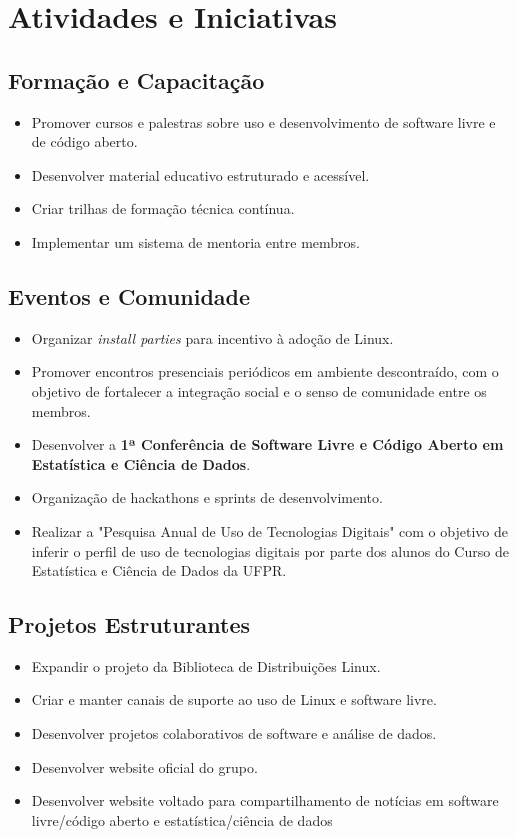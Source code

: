 \documentclass[11pt,a4paper]{article}
\begin{document}
\section{Atividades e Iniciativas}

\subsection{Formação e Capacitação}

\begin{itemize}
    \item Promover cursos e palestras sobre uso e desenvolvimento de software livre e de código aberto.
    \item Desenvolver material educativo estruturado e acessível.
    \item Criar trilhas de formação técnica contínua.
    \item Implementar um sistema de mentoria entre membros.
\end{itemize}

\subsection{Eventos e Comunidade}

\begin{itemize}
    \item Organizar \textit{install parties} para incentivo à adoção de Linux.
    \item Promover encontros presenciais periódicos em ambiente descontraído, com o objetivo de fortalecer a integração social e o senso de comunidade entre os membros.
    \item Desenvolver a \textbf{1ª Conferência de Software Livre e Código Aberto em Estatística e Ciência de Dados}.
    \item Organização de hackathons e sprints de desenvolvimento.
    \item Realizar a "Pesquisa Anual de Uso de Tecnologias Digitais" com o objetivo de inferir o perfil de uso de tecnologias digitais por parte dos alunos do Curso de Estatística e Ciência de Dados da UFPR.
\end{itemize}

\subsection{Projetos Estruturantes}

\begin{itemize}
    \item Expandir o projeto da Biblioteca de Distribuições Linux.
    \item Criar e manter canais de suporte ao uso de Linux e software livre.
    \item Desenvolver projetos colaborativos de software e análise de dados.
    \item Desenvolver website oficial do grupo.
    \item Desenvolver website voltado para compartilhamento de notícias em software livre/código aberto e estatística/ciência de dados
\end{itemize}
\end{document}
